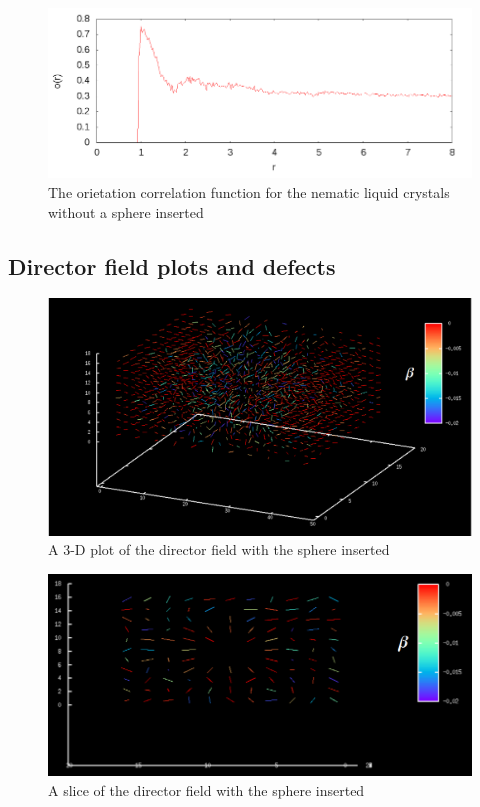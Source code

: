 \documentclass[preprint, aps]{revtex4-1}
\begin{document}
	\begin{figure}
		\includegraphics[width=\textwidth]{ocf.png}
		\caption{The orietation correlation function for the nematic liquid
		crystals without a sphere inserted}
		\label{fig:ocf}
	\end{figure}

\subsection*{Director field plots and defects}
	\begin{figure}
		\includegraphics[width=\textwidth]{biaxial-3d.png}
		\caption{A 3-D plot of the director field with the sphere inserted}
		\label{fig:biaxial-3d}
	\end{figure}

	\begin{figure}
		\includegraphics[width=\textwidth]{biaxial-2d.png}
		\caption{A slice of the director field with the sphere inserted}
		\label{fig:biaxial-2d}
	\end{figure}
\end{document}
